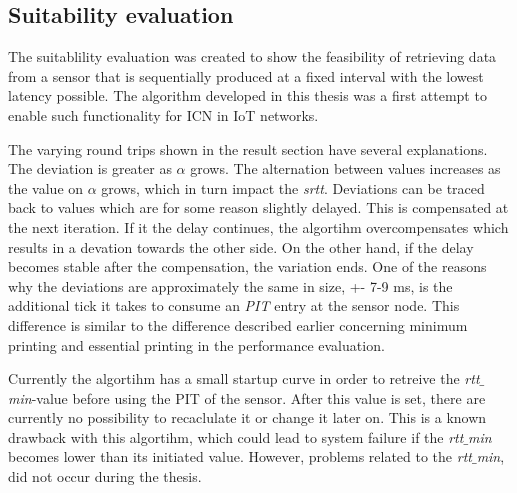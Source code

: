 \subsection{Suitability evaluation}
The suitablility evaluation was created to show the feasibility of retrieving data from a sensor that is sequentially produced at a fixed interval with the lowest latency possible. The algorithm developed in this thesis was a first attempt to enable such functionality for ICN in IoT networks.

The varying round trips shown in the result section have several explanations. The deviation is greater as $\alpha$ grows.
The alternation between values increases as the value on $\alpha$ grows, which in turn impact the \textit{srtt}. 
Deviations can be traced back to values which are for some reason slightly delayed. This is compensated at the next iteration. If it the delay continues, the algortihm overcompensates which results in a devation towards the other side. On the other hand, if the delay becomes stable after the compensation, the variation ends.
One of the reasons why the deviations are approximately the same in size, +- 7-9 ms, is the additional tick it takes to consume an \textit{PIT} entry at the sensor node. This difference is similar to the difference described earlier concerning minimum printing and essential printing in the performance evaluation.

Currently the algortihm has a small startup curve in order to retreive the \textit{rtt$\_$min}-value before using the PIT of the sensor. After this value is set, there are currently no possibility to recaclulate it or change it later on. This is a known drawback with this algortihm, which could lead to system failure if the \textit{rtt$\_$min} becomes lower than its initiated value. However, problems related to the \textit{rtt$\_$min}, did not occur during the thesis.

